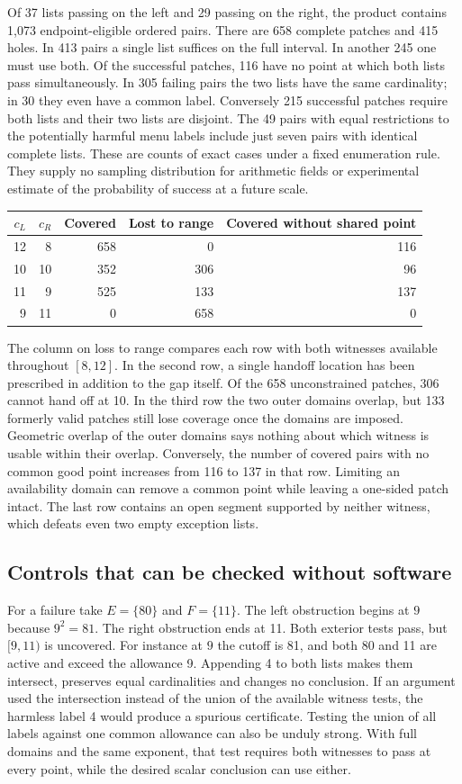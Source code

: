 \documentclass[12pt,letterpaper]{article}
\begin{document}
Of 37 lists passing on the left and 29 passing on the right, the product contains 1,073 endpoint-eligible ordered pairs. There are 658 complete patches and 415 holes. In 413 pairs a single list suffices on the full interval. In another 245 one must use both. Of the successful patches, 116 have no point at which both lists pass simultaneously. In 305 failing pairs the two lists have the same cardinality; in 30 they even have a common label. Conversely 215 successful patches require both lists and their two lists are disjoint. The 49 pairs with equal restrictions to the potentially harmful menu labels include just seven pairs with identical complete lists. These are counts of exact cases under a fixed enumeration rule. They supply no sampling distribution for arithmetic fields or experimental estimate of the probability of success at a future scale.

\begin{center}\begin{tabular}{rrrrr}
\toprule
\(c_L\)&\(c_R\)&Covered&Lost to range&Covered without shared point\\
\midrule
12&8 &658&0&116\\
10&10&352&306&96\\
11&9 &525&133&137\\
9&11 &0&658&0\\
\bottomrule
\end{tabular}\end{center}
The column on loss to range compares each row with both witnesses available throughout \([8,12]\). In the second row, a single handoff location has been prescribed in addition to the gap itself. Of the 658 unconstrained patches, 306 cannot hand off at 10. In the third row the two outer domains overlap, but 133 formerly valid patches still lose coverage once the domains are imposed. Geometric overlap of the outer domains says nothing about which witness is usable within their overlap. Conversely, the number of covered pairs with no common good point increases from 116 to 137 in that row. Limiting an availability domain can remove a common point while leaving a one-sided patch intact. The last row contains an open segment supported by neither witness, which defeats even two empty exception lists.

\subsection{Controls that can be checked without software}
For a failure take \(E=\{80\}\) and \(F=\{11\}\). The left obstruction begins at \(9\) because \(9^2=81\). The right obstruction ends at 11. Both exterior tests pass, but \([9,11)\) is uncovered. For instance at \(9\) the cutoff is 81, and both 80 and 11 are active and exceed the allowance 9. Appending 4 to both lists makes them intersect, preserves equal cardinalities and changes no conclusion. If an argument used the intersection instead of the union of the available witness tests, the harmless label 4 would produce a spurious certificate. Testing the union of all labels against one common allowance can also be unduly strong. With full domains and the same exponent, that test requires both witnesses to pass at every point, while the desired scalar conclusion can use either.
\end{document}
